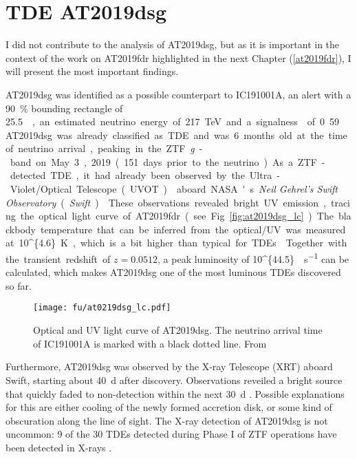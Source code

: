 \section{TDE AT2019dsg}
I did not contribute to the analysis of AT2019dsg, but as it is important in the context of the work on AT2019fdr highlighted in the next Chapter (\ref{at2019fdr}), I will present the most important findings.

AT2019dsg was identified as a possible counterpart to IC191001A, an alert with a \SI{90}{\percent} bounding rectangle of \SI{25.5}{\square\deg}, an estimated neutrino energy of \SI{217}{\tera\eV} and a signalness of 0.59 .

AT2019dsg was already classified as TDE and was 6 months old at the time of neutrino arrival, peaking in the ZTF \textit{g}-band on May 3, 2019 (151 days prior to the neutrino). As a ZTF-detected TDE, it had already been observed by the Ultra-Violet/Optical Telescope (UVOT)  aboard NASA's \textit{Neil Gehrel's Swift Observatory} (\textit{Swift}) . These observations revealed bright UV emission, tracing the optical light curve of AT2019fdr (see Fig. \ref{fig:at2019dsg_lc}).

The blackbody temperature that can be inferred from the optical/UV was measured at \SI[parse-numbers = false]{10^{4.6}}{\K}, which is a bit higher than typical for TDEs . Together with the transient redshift of $z=0.0512$, a peak luminosity of \SI[parse-numbers = false]{10^{44.5}}{\erg\per\s} can be calculated, which makes AT2019dsg one of the most luminous TDEs discovered so far.


\begin{figure*}[htb]
    \texttt{[image: fu/at0219dsg\_lc.pdf]}
    \caption[AT2019dsg optical/UV light curve]{Optical and UV light curve of AT2019dsg. The neutrino arrival time of IC191001A is marked with a black dotted line. From \cite{Stein2021}}
\end{figure*}

Furthermore, AT2019dsg was observed by the X-ray Telescope (XRT)  aboard Swift, starting about \SI{40}{\day} after discovery. Observations reveiled a bright source that quickly faded to non-detection within the next \SI{30}{\day} \cite{Stein2021}. Possible explanations for this are either cooling of the newly formed accretion disk, or some kind of obscuration along the line of sight. The X-ray detection of AT2019dsg is not uncommon: 9 of the 30 TDEs detected during Phase I of ZTF operations have been detected in X-rays .

